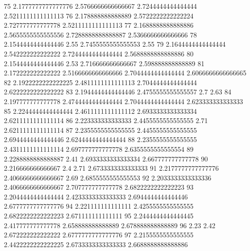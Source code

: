 75 2.1777777777777776 2.5766666666666667 2.7244444444444444 2.5211111111111113
76 2.178888888888889 2.5722222222222224 2.727777777777778 2.5211111111111113
77 2.1688888888888886 2.5655555555555556 2.7288888888888887 2.5366666666666666
78 2.1544444444444446 2.55 2.7455555555555553 2.55
79 2.1644444444444444 2.542222222222222 2.7244444444444444 2.5688888888888886
80 2.1544444444444446 2.53 2.716666666666667 2.598888888888889
81 2.172222222222222 2.5166666666666666 2.7044444444444444 2.6066666666666665
82 2.1922222222222225 2.4811111111111113 2.7044444444444444 2.6222222222222222
83 2.1944444444444446 2.4755555555555557 2.7 2.63
84 2.197777777777778 2.4744444444444444 2.7044444444444444 2.623333333333333
85 2.2244444444444444 2.4611111111111112 2.6933333333333334 2.6211111111111114
86 2.223333333333333 2.4455555555555555 2.71 2.6211111111111114
87 2.2355555555555555 2.4455555555555555 2.6944444444444446 2.6244444444444444
88 2.2355555555555555 2.4311111111111114 2.697777777777778 2.6355555555555554
89 2.2288888888888887 2.41 2.6933333333333334 2.667777777777778
90 2.216666666666667 2.4 2.71 2.6733333333333333
91 2.2177777777777776 2.4066666666666667 2.69 2.6855555555555553
92 2.2033333333333336 2.4066666666666667 2.707777777777778 2.6822222222222223
93 2.2044444444444444 2.4233333333333333 2.6944444444444446 2.6777777777777776
94 2.221111111111111 2.4255555555555555 2.6822222222222223 2.671111111111111
95 2.2444444444444445 2.417777777777778 2.658888888888889 2.678888888888889
96 2.23 2.42 2.672222222222222 2.6777777777777776
97 2.2155555555555555 2.4422222222222225 2.6733333333333333 2.6688888888888886
